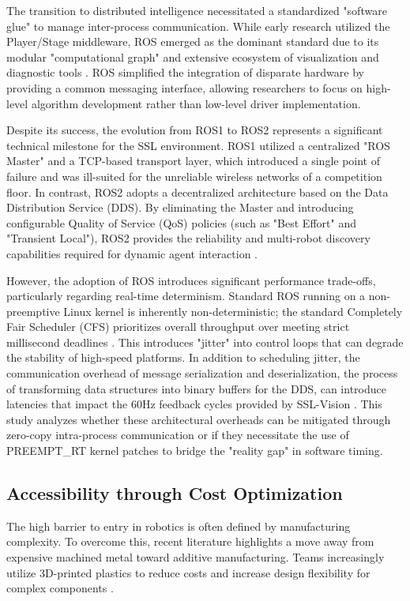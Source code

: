 \documentclass[a4paper,twoside,12pt]{report}
\begin{document}
The transition to distributed intelligence necessitated a standardized "software glue" to manage inter-process communication. While early research utilized the Player/Stage middleware, ROS emerged as the dominant standard due to its modular "computational graph" and extensive ecosystem of visualization and diagnostic tools \citep{joseph2018robot}. ROS simplified the integration of disparate hardware by providing a common messaging interface, allowing researchers to focus on high-level algorithm development rather than low-level driver implementation.

Despite its success, the evolution from ROS1 to ROS2 represents a significant technical milestone for the SSL environment. ROS1 utilized a centralized "ROS Master" and a TCP-based transport layer, which introduced a single point of failure and was ill-suited for the unreliable wireless networks of a competition floor. In contrast, ROS2 adopts a decentralized architecture based on the Data Distribution Service (DDS). By eliminating the Master and introducing configurable Quality of Service (QoS) policies (such as "Best Effort" and "Transient Local"), ROS2 provides the reliability and multi-robot discovery capabilities required for dynamic agent interaction \citep{macenski2022robot}.

However, the adoption of ROS introduces significant performance trade-offs, particularly regarding real-time determinism. Standard ROS running on a non-preemptive Linux kernel is inherently non-deterministic; the standard Completely Fair Scheduler (CFS) prioritizes overall throughput over meeting strict millisecond deadlines \citep{kronauer2021latency}. This introduces "jitter" into control loops that can degrade the stability of high-speed platforms. In addition to scheduling jitter, the communication overhead of message serialization and deserialization, the process of transforming data structures into binary buffers for the DDS, can introduce latencies that impact the 60Hz feedback cycles provided by SSL-Vision \citep{gutierrez2018towards}. This study analyzes whether these architectural overheads can be mitigated through zero-copy intra-process communication or if they necessitate the use of PREEMPT\_RT kernel patches to bridge the "reality gap" in software timing.

\subsection{Accessibility through Cost Optimization}
The high barrier to entry in robotics is often defined by manufacturing complexity. To overcome this, recent literature highlights a move away from expensive machined metal toward additive manufacturing. Teams increasingly utilize 3D-printed plastics to reduce costs and increase design flexibility for complex components \citep{liang2025first}.
\end{document}
